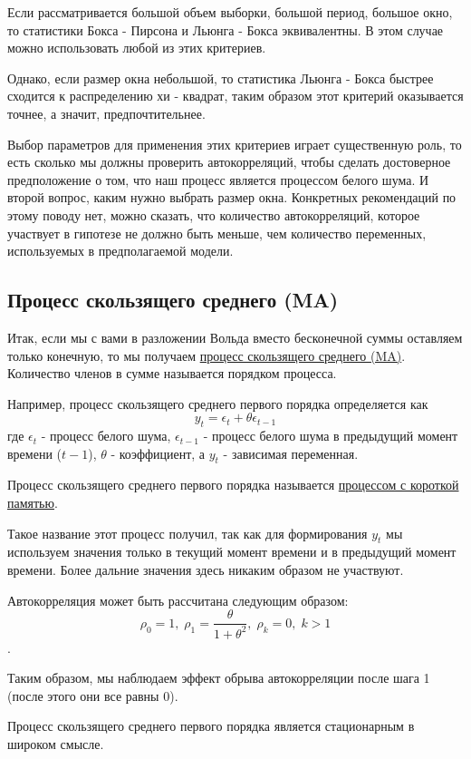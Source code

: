 \documentclass{article}
\begin{document}
Если рассматривается большой объем выборки, большой период, большое окно, то статистики Бокса - Пирсона и Льюнга - Бокса эквивалентны. В этом случае можно использовать любой из этих критериев.

Однако, если размер окна небольшой, то статистика Льюнга - Бокса быстрее сходится к распределению хи - квадрат, таким образом этот критерий оказывается точнее, а значит, предпочтительнее. 

Выбор параметров для применения этих критериев играет существенную роль, то есть сколько мы должны проверить автокорреляций, чтобы сделать достоверное предположение о том, что наш процесс является процессом белого шума. И второй вопрос, каким нужно выбрать размер окна. Конкретных рекомендаций по этому поводу нет, можно сказать, что количество автокорреляций, которое участвует в гипотезе не должно быть меньше, чем количество переменных, используемых в предполагаемой модели. 

\subsection{Процесс скользящего среднего (MA)}

Итак, если мы с вами в разложении Вольда вместо бесконечной суммы оставляем только конечную, то мы получаем \underline{процесс скользящего среднего (MA)}. Количество членов в сумме называется порядком процесса.  

Например, процесс скользящего среднего первого порядка определяется как $$y_t = \epsilon_t + \theta \epsilon_{t-1}$$ где $\epsilon_t$ - процесс белого шума, $\epsilon_{t-1}$ - процесс белого шума в предыдущий момент времени ($t-1$), $\theta$ - коэффициент, а $y_t$ - зависимая переменная. 

Процесс скользящего среднего первого порядка называется \underline{процессом с короткой памятью}. 

Такое название этот процесс получил, так как для формирования $y_t$ мы используем значения только в текущий момент времени и в предыдущий момент времени. Более дальние значения здесь никаким образом не участвуют. 

Автокорреляция может быть рассчитана следующим образом: $$\rho_0 = 1, \; \rho_1 = \frac{\theta}{1+\theta^2}, \; \rho_k = 0, \; k > 1$$. 

Таким образом, мы наблюдаем эффект обрыва автокорреляции после шага 1 (после этого они все равны 0). 

Процесс скользящего среднего первого порядка является стационарным в широком смысле. 
\end{document}
